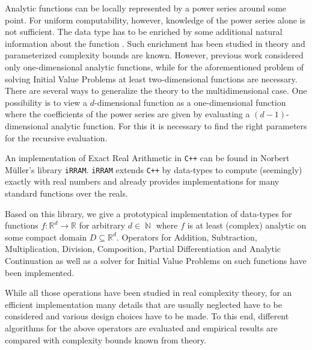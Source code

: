 \documentclass{article}
\newcommand{\RR}{\mathbb R}
\DeclareMathOperator{\NN}{\mathbb N}
\newcommand{\cc}{\texttt{C++}\xspace}
\newcommand{\irram}{\texttt{iRRAM}\xspace}
\begin{document}
Analytic functions can be locally represented by a power series around some point.
For uniform computability, however, knowledge of the power series alone is not sufficient.
The data type has to be enriched by some additional natural information about the function \cite{Mueller95}.
Such enrichment has been studied in theory and parameterized complexity bounds are known.
However, previous work considered only one-dimensional analytic functions, while for the aforementioned problem of solving Initial Value Problems at least two-dimensional functions are necessary.
There are several ways to generalize the theory to the multidimensional case.
One possibility is to view a $d$-dimensional function as a one-dimensional function where the coefficients of the power series are given by evaluating a $(d-1)$-dimensional analytic function.
For this it is necessary to find the right parameters for the recursive evaluation.

An implementation of Exact Real Arithmetic in \cc can be found in Norbert Müller's library \irram \cite{Mueller00}.
\irram extends \cc by data-types to compute (seemingly) exactly with real numbers and already provides implementations for many standard functions over the reals.

Based on this library, we give a prototypical implementation of data-types for functions $f: \RR^d \to \RR$ for arbitrary $d \in \NN$ where $f$ is at least (complex) analytic on some compact domain $D \subseteq \RR^d$.
Operators for Addition, Subtraction, Multiplication, Division, Composition, Partial Differentiation and Analytic Continuation as well as a solver for Initial Value Problems on such functions have been implemented.

While all those operations have been studied in real complexity theory, for an efficient implementation many details that are usually neglected have to be considered and various design choices have to be made.
To this end, different algorithms for the above operators are evaluated and empirical results are compared with complexity bounds known from theory. 


{}
\end{document}
